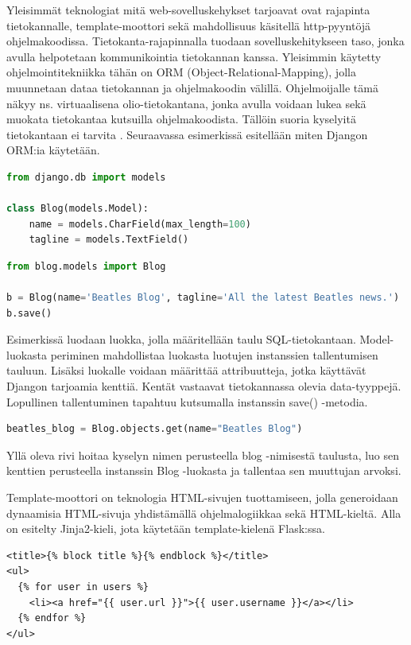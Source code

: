 \documentclass[utf8]{gradu3}
\begin{document}
Yleisimmät teknologiat mitä web-sovelluskehykset tarjoavat ovat rajapinta tietokannalle, template-moottori sekä mahdollisuus käsitellä http-pyyntöjä ohjelmakoodissa. Tietokanta-rajapinnalla tuodaan sovelluskehitykseen taso, jonka avulla helpotetaan kommunikointia tietokannan kanssa. Yleisimmin käytetty ohjelmointitekniikka tähän on ORM (Object-Relational-Mapping), jolla muunnetaan dataa tietokannan ja ohjelmakoodin välillä. Ohjelmoijalle tämä näkyy ns. virtuaalisena olio-tietokantana, jonka avulla voidaan lukea sekä muokata tietokantaa kutsuilla ohjelmakoodista. Tällöin suoria kyselyitä tietokantaan ei tarvita \parencite{Ghandeharizadeh}. Seuraavassa esimerkissä esitellään miten Djangon ORM:ia käytetään.

\begin{lstlisting}[language=Python]
from django.db import models

class Blog(models.Model):
    name = models.CharField(max_length=100)
	tagline = models.TextField()
\end{lstlisting}

\begin{lstlisting}[language=Python]
from blog.models import Blog

b = Blog(name='Beatles Blog', tagline='All the latest Beatles news.')
b.save()
\end{lstlisting}

Esimerkissä luodaan luokka, jolla määritellään taulu SQL-tietokantaan. Model-luokasta periminen mahdollistaa luokasta luotujen instanssien tallentumisen tauluun. Lisäksi
luokalle voidaan määrittää attribuutteja, jotka käyttävät Djangon tarjoamia kenttiä. Kentät vastaavat tietokannassa olevia data-tyyppejä. Lopullinen tallentuminen
tapahtuu kutsumalla instanssin save() -metodia.


\begin{lstlisting}[language=Python]
beatles_blog = Blog.objects.get(name="Beatles Blog")
\end{lstlisting}

Yllä oleva rivi hoitaa kyselyn nimen perusteella blog -nimisestä taulusta, luo sen kenttien perusteella instanssin Blog -luokasta ja tallentaa sen muuttujan arvoksi.


Template-moottori on teknologia HTML-sivujen tuottamiseen, jolla generoidaan dynaamisia HTML-sivuja yhdistämällä ohjelmalogiikkaa sekä HTML-kieltä. Alla on esitelty Jinja2-kieli, jota käytetään template-kielenä Flask:ssa.
\pagebreak

\begin{lstlisting}[language=Smalltalk]
<title>{% block title %}{% endblock %}</title>
<ul>
  {% for user in users %}
	<li><a href="{{ user.url }}">{{ user.username }}</a></li>
  {% endfor %}
</ul>
\end{lstlisting}
\end{document}
